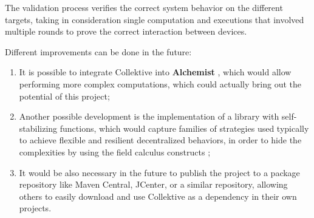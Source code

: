 The validation process verifies the correct system behavior on the different targets, taking in consideration single computation and executions that involved multiple rounds to prove the correct interaction between devices.

Different improvements can be done in the future:
\begin{enumerate}
    \item It is possible to integrate Collektive into \textbf{Alchemist} \cite{alchemist}, which would allow performing more complex computations, which could actually bring out the potential of this project;
    \item Another possible development is the implementation of a library with self-stabilizing functions, which would capture families of strategies used typically to achieve flexible and resilient decentralized behaviors, in order to hide the complexities by using the field calculus constructs \cite{self_stabilisation_functions};
    \item It would be also necessary in the future to publish the project  to a package repository like Maven Central, JCenter, or a similar repository, allowing others to easily download and use Collektive as a dependency in their own projects.
\end{enumerate}